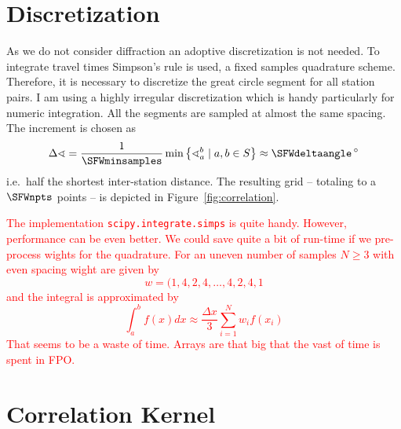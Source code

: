 \documentclass[11pt]{article}
\newcommand\worries[1]{\textcolor{red}{#1}}
\begin{document}
\section{Discretization}

As we do not consider diffraction an adoptive discretization is not needed.
To integrate travel times Simpson's rule is used, a fixed samples quadrature scheme.
Therefore, it is necessary to discretize the great circle segment for all station pairs.
I am using a highly irregular discretization which is handy particularly for numeric integration.
All the segments are sampled at almost the same spacing.
The increment is chosen as
\begin{equation}
    \Delta\sphericalangle = \frac 1 \SFWminsamples \min\left\{ \sphericalangle_a^b \mid a,b \in S \right\}
    \approx \SFWdeltaangle \,{}^\circ
\end{equation}
i.e.~half the shortest inter-station distance.
The resulting grid -- totaling to a $\SFWnpts$ points -- is depicted in Figure~\ref{fig:correlation}.

\worries{The implementation \texttt{scipy.integrate.simps} is quite handy.
However, performance can be even better.
We could save quite a bit of run-time if we pre-process wights for the quadrature.
For an uneven number of samples $N\geq3$ with even spacing wight are given by
\begin{equation}
    w = (1,4,2,4, \dots ,4,2,4,1
\end{equation}
and the integral is approximated by
\begin{equation}
    \int_a^b f(x) d x \approx
    \frac{\Delta x}3\sum_{i=1}^N w_if(x_i)
\end{equation}
That seems to be a waste of time.
Arrays are that big that the vast of time is spent in FPO.
}


\section{Correlation Kernel}
\end{document}
